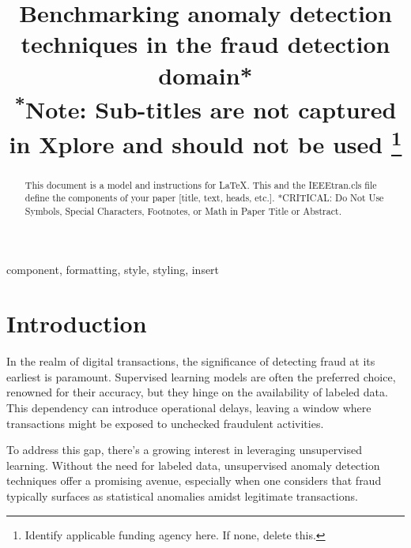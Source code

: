 \documentclass[conference]{IEEEtran}
\begin{document}
\title{Benchmarking anomaly detection techniques in the fraud detection domain*\\
{\footnotesize \textsuperscript{*}Note: Sub-titles are not captured in Xplore and
should not be used}
\thanks{Identify applicable funding agency here. If none, delete this.}
}

\author{
    \and
}

\maketitle

\begin{abstract}
    This document is a model and instructions for \LaTeX.
    This and the IEEEtran.cls file define the components of your paper [title, text, heads, etc.]. *CRITICAL: Do Not Use Symbols, Special Characters, Footnotes,
    or Math in Paper Title or Abstract.
\end{abstract}

\begin{IEEEkeywords}
    component, formatting, style, styling, insert
\end{IEEEkeywords}

\section{Introduction}
In the realm of digital transactions, the significance of detecting fraud at its earliest is paramount. Supervised learning models are often the preferred choice, renowned for their accuracy, but they hinge on the availability of labeled data. This dependency can introduce operational delays, leaving a window where transactions might be exposed to unchecked fraudulent activities.

To address this gap, there's a growing interest in leveraging unsupervised learning. Without the need for labeled data, unsupervised anomaly detection techniques offer a promising avenue, especially when one considers that fraud typically surfaces as statistical anomalies amidst legitimate transactions.
\end{document}
